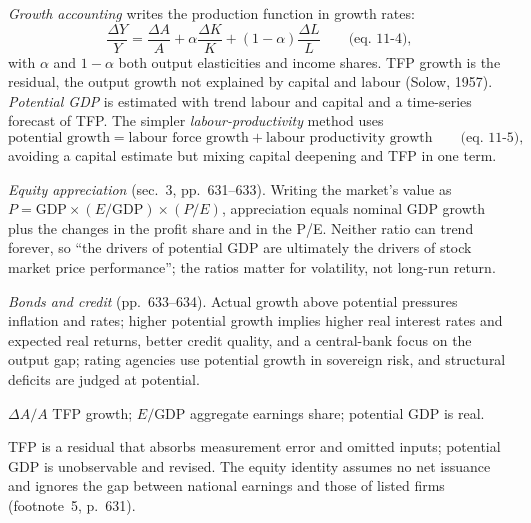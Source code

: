 \begin{qfmethod}\label{meth:potential-gdp-growth-accounting}
 \emph{Growth accounting} \citep[chap.~11, sec.~4.3, pp.~640--641]{economics-investment-decision-makers-2013} writes the production function in growth rates:
\[
\frac{\Delta Y}{Y}=\frac{\Delta A}{A}+\alpha\frac{\Delta K}{K}+(1-\alpha)\frac{\Delta L}{L}\qquad\text{(eq.~11-4)},
\]
with $\alpha$ and $1-\alpha$ both output elasticities and income shares. TFP growth is the residual, the output growth not explained by capital and labour (Solow, 1957). \emph{Potential GDP} is estimated with trend labour and capital and a time-series forecast of TFP. The simpler \emph{labour-productivity} method uses
\[
\text{potential growth}=\text{labour force growth}+\text{labour productivity growth}\qquad\text{(eq.~11-5)},
\]
avoiding a capital estimate but mixing capital deepening and TFP in one term.

\emph{Equity appreciation} (sec.~3, pp.~631--633). Writing the market's value as $P=\text{GDP}\times(E/\text{GDP})\times(P/E)$, appreciation equals nominal GDP growth plus the changes in the profit share and in the P/E. Neither ratio can trend forever, so ``the drivers of potential GDP are ultimately the drivers of stock market price performance''; the ratios matter for volatility, not long-run return.

\emph{Bonds and credit} (pp.~633--634). Actual growth above potential pressures inflation and rates; higher potential growth implies higher real interest rates and expected real returns, better credit quality, and a central-bank focus on the output gap; rating agencies use potential growth in sovereign risk, and structural deficits are judged at potential.

 $\Delta A/A$ TFP growth; $E/\text{GDP}$ aggregate earnings share; potential GDP is real.

 TFP is a residual that absorbs measurement error and omitted inputs; potential GDP is unobservable and revised. The equity identity assumes no net issuance and ignores the gap between national earnings and those of listed firms (footnote~5, p.~631).


\end{qfmethod}
